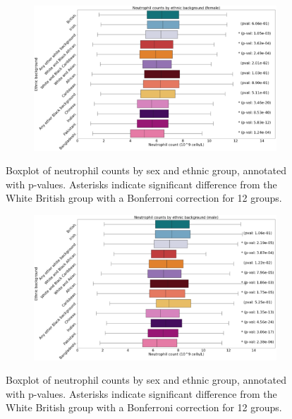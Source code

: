 \documentclass[12pt]{pnas-new}
\begin{document}
\begin{figure}
    \centering
    \begin{subfigure}{\textwidth}
    \includegraphics[width=\textwidth]{images/female_neutrophil_boxplot_annotated.pdf}
    \end{subfigure}
    \caption{Boxplot of neutrophil counts by sex and ethnic group, annotated with p-values. Asterisks indicate significant difference from the White British group with a Bonferroni correction for 12 groups.}
    \label{fig:supp_box_neutrophill_f}
\end{figure}

\begin{figure}
    \centering
    \begin{subfigure}{\textwidth}
    \includegraphics[width=\textwidth]{images/male_neutrophil_boxplot_annotated.pdf}
    \end{subfigure}
    \caption{Boxplot of neutrophil counts by sex and ethnic group, annotated with p-values. Asterisks indicate significant difference from the White British group with a Bonferroni correction for 12 groups.}
    \label{fig:supp_box_neutrophill_m}
\end{figure}
\end{document}
